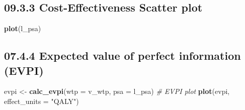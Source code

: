 \documentclass[
]{article}
\newenvironment{Shaded}{\begin{snugshade}}{\end{snugshade}}
\newcommand{\CommentTok}[1]{\textcolor[rgb]{0.56,0.35,0.01}{\textit{#1}}}
\newcommand{\DataTypeTok}[1]{\textcolor[rgb]{0.13,0.29,0.53}{#1}}
\newcommand{\KeywordTok}[1]{\textcolor[rgb]{0.13,0.29,0.53}{\textbf{#1}}}
\newcommand{\NormalTok}[1]{#1}
\newcommand{\StringTok}[1]{\textcolor[rgb]{0.31,0.60,0.02}{#1}}
\begin{document}
\hypertarget{cost-effectiveness-scatter-plot}{%
\subsection{09.3.3 Cost-Effectiveness Scatter
plot}\label{cost-effectiveness-scatter-plot}}

\begin{Shaded}
\begin{Highlighting}[]
\KeywordTok{plot}\NormalTok{(l_psa)}
\end{Highlighting}
\end{Shaded}

\hypertarget{expected-value-of-perfect-information-evpi}{%
\subsection{07.4.4 Expected value of perfect information
(EVPI)}\label{expected-value-of-perfect-information-evpi}}

\begin{Shaded}
\begin{Highlighting}[]
\NormalTok{evpi <-}\StringTok{ }\KeywordTok{calc_evpi}\NormalTok{(}\DataTypeTok{wtp =}\NormalTok{ v_wtp, }\DataTypeTok{psa =}\NormalTok{ l_psa)}
\CommentTok{# EVPI plot}
\KeywordTok{plot}\NormalTok{(evpi, }\DataTypeTok{effect_units =} \StringTok{"QALY"}\NormalTok{)}
\end{Highlighting}
\end{Shaded}
\end{document}
